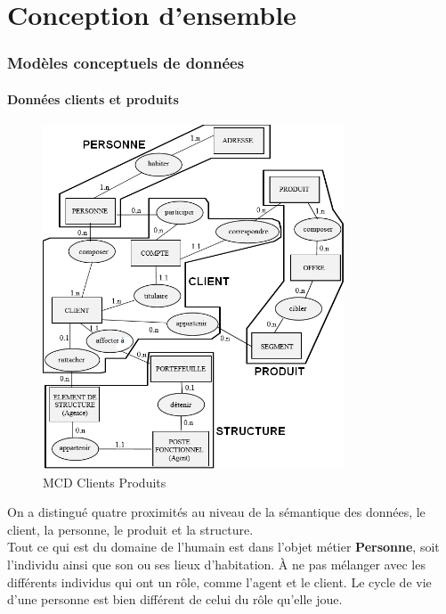\part{Conception d'ensemble}
\setcounter{section}{0}

\section{Modèles conceptuels de données} 

\subsection{Données clients et produits} 

\begin{figure}[H]
\centering
\includegraphics[width=0.8\textwidth]{figures/mcd/MCD_Clients_Produits}
\caption{MCD Clients Produits}
\end{figure}

On a distingué quatre proximités au niveau de la sémantique des données, le client, la personne, le produit et la structure. \\

Tout ce qui est du domaine de l'humain est dans l'objet métier \textbf{Personne}, soit l'individu ainsi que son ou ses lieux d'habitation. À ne pas mélanger avec les différents individus qui ont un rôle, comme l'agent et le client. Le cycle de vie d'une personne est bien différent de celui du rôle qu'elle joue. \\

